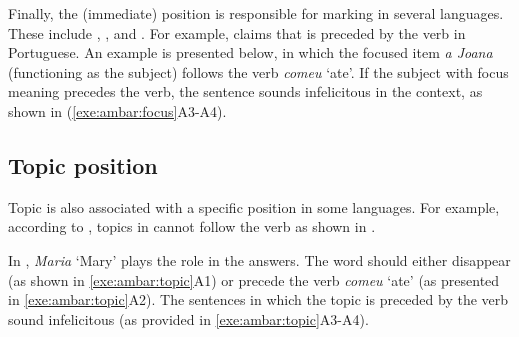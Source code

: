 Finally, the (immediate)  position is responsible for
marking  in several languages. These include
 \citep{ambar:99}, , and
 \citep{van:05}.  For example, \citeauthor{ambar:99}
claims that  is preceded by the verb in
Portuguese. An example is presented below, in which the focused item
\textit{a Joana} (functioning as the subject) follows the verb
\textit{comeu} `ate'. If the subject with focus meaning precedes the
verb, the sentence sounds infelicitous in the context, as shown in
(\ref{exe:ambar:focus}A3-A4).






\subsection{Topic position}
\label{4:ssec:topic-position}

Topic is also associated with a specific position in some languages.
For example, according to \citet{ambar:99}, topics in 
cannot follow the verb as shown in .



\noindent In , \textit{Maria} `Mary' plays the
 role in the answers. The word should either disappear (as shown
in \ref{exe:ambar:topic}A1) or precede the verb \textit{comeu} `ate'
(as presented in \ref{exe:ambar:topic}A2). The sentences in which
the topic is preceded by the verb sound infelicitous (as provided in
\ref{exe:ambar:topic}A3-A4).



